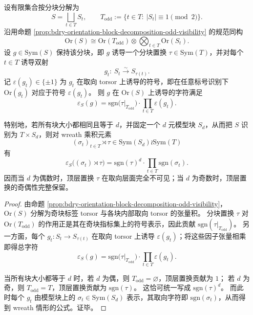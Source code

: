 \begin{theorem}\label{thm:bdry-orientation-wreath-character-odd-visibility}
设有限集合按分块分解为
\[
S=\bigsqcup_{t\in T}S_t,
\qquad
T_{\mathrm{odd}}:=\{t\in T:\ |S_t|\equiv 1\pmod 2\}.
\]
沿用命题 \ref{prop:bdry-orientation-block-decomposition-odd-visibility} 的规范同构
\[
\mathrm{Or}(S)\cong \mathrm{Or}(T_{\mathrm{odd}})\otimes \bigotimes_{t\in T}\mathrm{Or}(S_t).
\]
设 \(g\in \mathrm{Sym}(S)\) 保持该分块，即 \(g\) 诱导一个分块置换 \(\tau\in \mathrm{Sym}(T)\)，并对每个 \(t\in T\) 诱导双射
\[
g_t:\ S_t\xrightarrow{\sim} S_{\tau(t)}.
\]
记 \(\varepsilon(g_t)\in\{\pm 1\}\) 为 \(g_t\) 在取向 torsor 上诱导的符号，即在任意标号识别下 \(\mathrm{Or}(g_t)\) 对应于符号 \(\varepsilon(g_t)\)。
则 \(g\) 在 \(\mathrm{Or}(S)\) 上诱导的字符满足
\[
\varepsilon_S(g)
=
\mathrm{sgn}\!\bigl(\tau|_{T_{\mathrm{odd}}}\bigr)\cdot
\prod_{t\in T}\varepsilon(g_t).
\]

特别地，若所有块大小都相同且等于 \(d\)，并固定一个 \(d\) 元模型块 \(S_d\)，从而把 \(S\) 识别为 \(T\times S_d\)，则对 wreath 乘积元素
\[
(\sigma_t)_{t\in T}\rtimes \tau\in \mathrm{Sym}(S_d)\wr \mathrm{Sym}(T)
\]
有
\[
\varepsilon_S\bigl((\sigma_t)\rtimes \tau\bigr)
=
\mathrm{sgn}(\tau)^d\cdot \prod_{t\in T}\mathrm{sgn}(\sigma_t).
\]
因而当 \(d\) 为偶数时，顶层置换 \(\tau\) 在取向层面完全不可见；当 \(d\) 为奇数时，顶层置换的奇偶性完整保留。
\end{theorem}
\begin{proof}
由命题 \ref{prop:bdry-orientation-block-decomposition-odd-visibility}，
\(\mathrm{Or}(S)\) 分解为奇块标签 torsor 与各块内部取向 torsor 的张量积。
分块置换 \(\tau\) 对 \(\mathrm{Or}(T_{\mathrm{odd}})\) 的作用正是其在奇块指标集上的符号表示，因此贡献
\(
\mathrm{sgn}(\tau|_{T_{\mathrm{odd}}})
\)。
另一方面，每个 \(g_t:S_t\to S_{\tau(t)}\) 在取向 torsor 上诱导 \(\varepsilon(g_t)\)；将这些因子张量相乘即得总字符
\[
\varepsilon_S(g)
=
\mathrm{sgn}\!\bigl(\tau|_{T_{\mathrm{odd}}}\bigr)\cdot
\prod_{t\in T}\varepsilon(g_t).
\]
\par
当所有块大小都等于 \(d\) 时，若 \(d\) 为偶，则 \(T_{\mathrm{odd}}=\varnothing\)，顶层置换贡献为 \(1\)；
若 \(d\) 为奇，则 \(T_{\mathrm{odd}}=T\)，顶层置换贡献为 \(\mathrm{sgn}(\tau)\)。
这恰可统一写成 \(\mathrm{sgn}(\tau)^d\)。
而此时每个 \(g_t\) 由模型块上的 \(\sigma_t\in \mathrm{Sym}(S_d)\) 表示，其取向字符即 \(\mathrm{sgn}(\sigma_t)\)，从而得到 wreath 情形的公式。证毕。
\end{proof}

